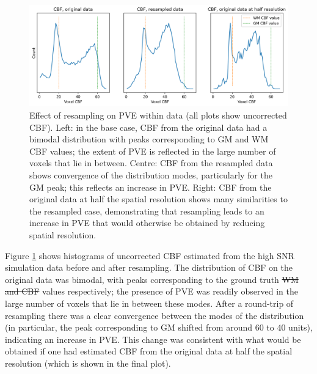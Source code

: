 \documentclass[12pt]{report}
\providecommand{\DIFaddtex}[1]{{\protect\color{blue}\uwave{#1}}} %
\providecommand{\DIFdeltex}[1]{{\protect\color{red}\sout{#1}}}                      %
\providecommand{\DIFaddbegin}{} %
\providecommand{\DIFaddend}{} %
\providecommand{\DIFdelbegin}{} %
\providecommand{\DIFdelend}{} %
\providecommand{\DIFadd}[1]{\texorpdfstring{\DIFaddtex{#1}}{#1}} %
\providecommand{\DIFdel}[1]{\texorpdfstring{\DIFdeltex{#1}}{}} %
\newcommand{\DIFscaledelfig}{0.5}
\newlength{\DIFdelgraphicswidth} %
\newlength{\DIFdelgraphicsheight} %
\newcommand{\DIFaddincludegraphics}[2][]{{\color{blue}\fbox{\DIFOincludegraphics[#1]{#2}}}} %
\newcommand{\DIFdelincludegraphics}[2][]{%
\sbox{\DIFdelgraphicsbox}{\DIFOincludegraphics[#1]{#2}}%
\settoboxwidth{\DIFdelgraphicswidth}{\DIFdelgraphicsbox} %
\settoboxtotalheight{\DIFdelgraphicsheight}{\DIFdelgraphicsbox} %
\scalebox{\DIFscaledelfig}{%
\parbox[b]{\DIFdelgraphicswidth}{\usebox{\DIFdelgraphicsbox}\\[-\baselineskip] \rule{\DIFdelgraphicswidth}{0em}}\llap{\resizebox{\DIFdelgraphicswidth}{\DIFdelgraphicsheight}{%
\setlength{\unitlength}{\DIFdelgraphicswidth}%
\begin{picture}(1,1)%
\thicklines\linethickness{2pt} %
{\color[rgb]{1,0,0}\put(0,0){\framebox(1,1){}}}%
{\color[rgb]{1,0,0}\put(0,0){\line( 1,1){1}}}%
{\color[rgb]{1,0,0}\put(0,1){\line(1,-1){1}}}%
\end{picture}%
}\hspace*{3pt}}} %
} %
\DeclareRobustCommand{\DIFaddbegin}{\DIFOaddbegin \let\includegraphics\DIFaddincludegraphics} %
\DeclareRobustCommand{\DIFaddend}{\DIFOaddend \let\includegraphics\DIFOincludegraphics} %
\DeclareRobustCommand{\DIFdelbegin}{\DIFOdelbegin \let\includegraphics\DIFdelincludegraphics} %
\DeclareRobustCommand{\DIFdelend}{\DIFOaddend \let\includegraphics\DIFOincludegraphics} %
\begin{document}
\begin{figure}[H]
\centering
\includegraphics[width = \textwidth]{sim_asl_resamp_hist.png}
\caption{Effect of resampling on PVE within data (all plots show uncorrected CBF). Left: in the base case, CBF from the original data had a bimodal distribution with peaks corresponding to GM and WM CBF values; the extent of PVE is reflected in the large number of voxels that lie in between. Centre: CBF from the resampled data shows convergence of the distribution modes, particularly for the GM peak; this reflects an increase in PVE. Right: CBF from the original data at half the spatial resolution shows many similarities to the resampled case, demonstrating that resampling leads to an increase in PVE that would otherwise be obtained by reducing spatial resolution.}
\label{sim_asl_resamp_hist}
\end{figure}

Figure \ref{sim_asl_resamp_hist} shows histograms of uncorrected CBF estimated from the high SNR simulation data before and after resampling. The distribution of CBF on the original data was bimodal, with peaks corresponding to the ground truth \DIFdelbegin \DIFdel{WM and CBF }\DIFdelend \DIFaddbegin \DIFadd{GM and WM }\DIFaddend values respectively; the presence of PVE was readily observed in the large number of voxels that lie in between these modes. After a round-trip of resampling there was a clear convergence between the modes of the distribution (in particular, the peak corresponding to GM shifted from around 60 to 40 units), indicating an increase in PVE. This change was consistent with what would be obtained if one had estimated CBF from the original data at half the spatial resolution (which is shown in the final plot). 
\end{document}
